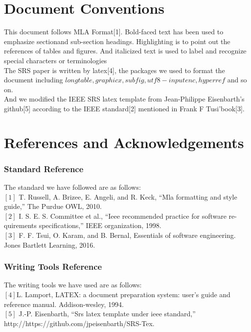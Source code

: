 \documentclass[16pt]{scrreprt}
\begin{document}
\section{Document Conventions}
This document follows MLA Format[1]. Bold-faced text has been used to emphasize sectionand sub-section headings. Highlighting is to point out the references of tables and figures. And italicized text is used to label and recognize special characters or terminologies\\

The SRS paper is written by latex[4], the packages we used to format the document including \small{$longtable, graphicx, subfig, utf8-inputenc,hyperref$ }and so on.\\
And we modified the IEEE SRS latex template from Jean-Philippe Eisenbarth's github[5] according to the IEEE standard[2] mentioned in Frank F Tusi'book[3].


\section{References and Acknowledgements}
\subsubsection{Standard Reference}
The standard we have followed are as follows:\\

$[1]$ T. Russell, A. Brizee, E. Angeli, and R. Keck, “Mla formatting and style guide,” The Purdue OWL, 2010.\\

$[2]$ I. S. E. S. Committee et al., “Ieee recommended practice for software re- quirements specifications,” IEEE organization, 1998.\\


$[3]$ F. F. Tsui, O. Karam, and B. Bernal, Essentials of software engineering. Jones Bartlett Learning, 2016.

\subsubsection{Writing Tools Reference}
The writing tools we have used are as follows:\\

$[4]$L. Lamport, LATEX: a document preparation system: user’s guide and reference manual. Addison-wesley, 1994.\\

$[5]$ J.-P. Eisenbarth, “Srs latex template under ieee standard,” \\http://https://github.com/jpeisenbarth/SRS-Tex.
\end{document}
